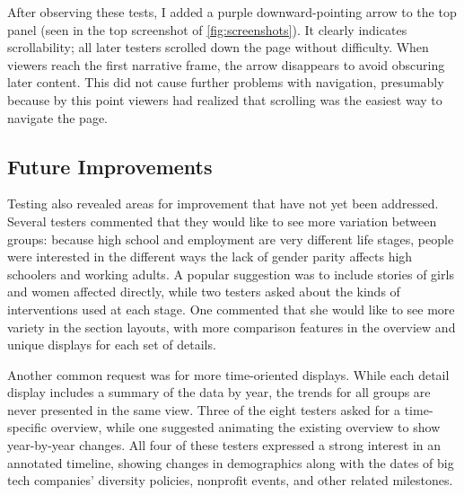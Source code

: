 {After observing these tests, I added a purple downward-pointing arrow to the top panel (seen in the top screenshot of \autoref{fig:screenshots}). It clearly indicates scrollability; all later testers scrolled down the page without difficulty. When viewers reach the first narrative frame, the arrow disappears to avoid obscuring later content. This did not cause further problems with navigation, presumably because by this point viewers had realized that scrolling was the easiest way to navigate the page.

\subsection{Future Improvements}
Testing also revealed areas for improvement that have not yet been addressed. Several testers commented that they would like to see more variation between groups: because high school and employment are very different life stages, people were interested in the different ways the lack of gender parity affects high schoolers and working adults. A popular suggestion was to include stories of girls and women affected directly, while two testers asked about the kinds of interventions used at each stage. One commented that she would like to see more variety in the section layouts, with more comparison features in the overview and unique displays for each set of details.

Another common request was for more time-oriented displays. While each detail display includes a summary of the data by year, the trends for all groups are never presented in the same view. Three of the eight testers asked for a time-specific overview, while one suggested animating the existing overview to show year-by-year changes. All four of these testers expressed a strong interest in an annotated timeline, showing changes in demographics along with the dates of big tech companies' diversity policies, nonprofit events, and other related milestones.
}

